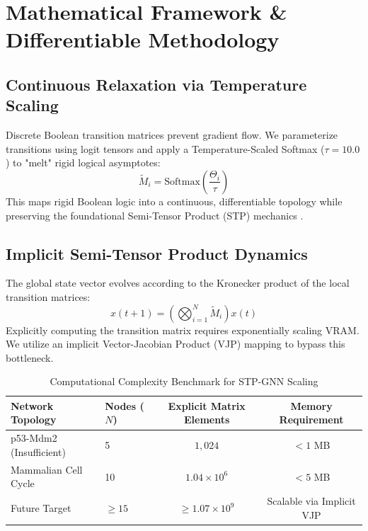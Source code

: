 \documentclass[11pt, letterpaper]{article}
\begin{document}
	\section{Mathematical Framework \& Differentiable Methodology}
	
	\subsection{Continuous Relaxation via Temperature Scaling}
	Discrete Boolean transition matrices prevent gradient flow. We parameterize transitions using logit tensors and apply a Temperature-Scaled Softmax ($\tau = 10.0$) to "melt" rigid logical asymptotes:
	\begin{equation}
		\tilde{M}_i = \text{Softmax}\left(\frac{\Theta_i}{\tau}\right)
	\end{equation}
	This maps rigid Boolean logic into a continuous, differentiable topology while preserving the foundational Semi-Tensor Product (STP) mechanics \cite{cheng2011, cheng2025}.
	
	\subsection{Implicit Semi-Tensor Product Dynamics}
	The global state vector evolves according to the Kronecker product of the local transition matrices:
	\begin{equation}
		x(t+1) = \left( \bigotimes_{i=1}^{N} \tilde{M}_i \right) x(t)
	\end{equation}
	Explicitly computing the transition matrix requires exponentially scaling VRAM. We utilize an implicit Vector-Jacobian Product (VJP) mapping to bypass this bottleneck.
	
	\begin{table}[h!]
		\centering
		\caption{Computational Complexity Benchmark for STP-GNN Scaling}
		\vspace{0.1in}
		\begin{tabular}{@{}llcc@{}}
			\toprule
			\textbf{Network Topology} & \textbf{Nodes ($N$)} & \textbf{Explicit Matrix Elements} & \textbf{Memory Requirement} \\ \midrule
			p53-Mdm2 (Insufficient) & 5 & $1,024$ & $< 1$ MB \\
			Mammalian Cell Cycle & 10 & $1.04 \times 10^6$ & $< 5$ MB \\
			Future Target & $\ge 15$ & $\ge 1.07 \times 10^9$ & Scalable via Implicit VJP \\ \bottomrule
		\end{tabular}
	\end{table}
	
\end{document}
